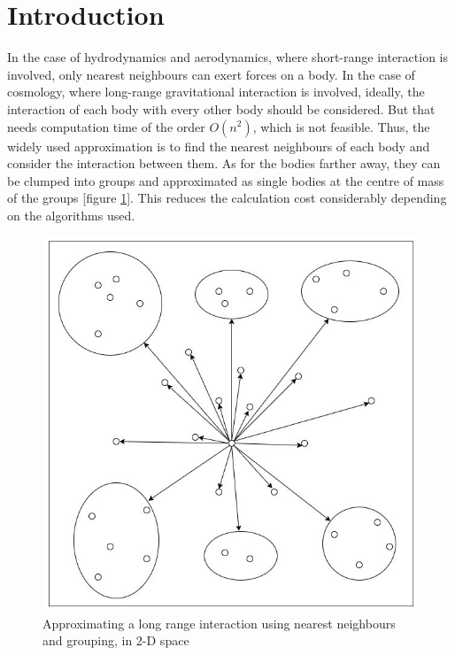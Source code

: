 \documentclass[twocolumn,11pt]{article}
\begin{document}
\section{Introduction}
In the case of hydrodynamics and aerodynamics, where short-range interaction is involved, only nearest neighbours can exert forces on a body. In the case of cosmology, where long-range gravitational interaction is involved, ideally, the interaction of each body with every other body should be considered. But that needs computation time of the order $O(n^{2})$, which is not feasible. Thus, the widely used approximation is to find the nearest neighbours of each body and consider the interaction between them. As for the bodies farther away, they can be clumped into groups and approximated as single bodies at the centre of mass of the groups [figure \ref{fig1}]. This reduces the calculation cost considerably depending on the algorithms used.
\begin{figure}
\centering
	\includegraphics[width=0.9\linewidth]{nearest}
	\caption{\small{Approximating a long range interaction using nearest neighbours and grouping, in 2-D space}}
	\label{fig1}
\end{figure}
\end{document}
